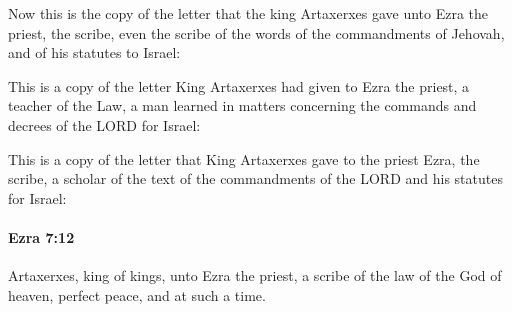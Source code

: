 			\begin{versebox}
					\item[BHS] 
					\item[LXX] 
					\item[ASV] Now this is the copy of the letter that the king Artaxerxes gave unto Ezra the priest, the scribe, even the scribe of the words of the commandments of Jehovah, and of his statutes to Israel:
					\item[NIV] This is a copy of the letter King Artaxerxes had given to Ezra the priest, a teacher of the Law, a man learned in matters concerning the commands and decrees of the LORD for Israel:
					\item[NRSV] This is a copy of the letter that King Artaxerxes gave to the priest Ezra, the scribe, a scholar of the text of the commandments of the LORD and his statutes for Israel:
			\end{versebox}

		\paragraph{Ezra 7:12} %
			\label{EZRA-7-12}

			Artaxerxes, king of kings, unto Ezra the priest, a scribe of the law of the God of heaven, perfect peace, and at such a time.

